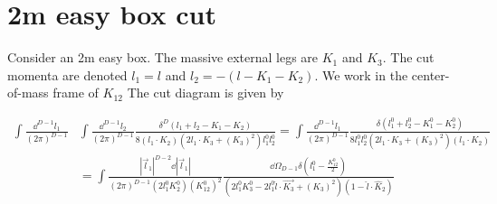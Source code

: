\section{2m easy box cut}
Consider an 2m easy box.
The massive external legs are $K_1$ and $K_3$.
The cut momenta are denoted $l_1 = l$ and $l_2 = -( l-K_1-K_2)$.
We work in the center-of-mass frame of $K_{12}$
The cut diagram is given by

\begin{equation*}
\begin{split}
\int\frac{\dd^{D-1}l_1}{(2\pi)^{D-1}} &
 \int\frac{\dd^{D-1}l_2}{(2\pi)^{D-1}}
\frac{\delta^{D}(l_1 + l_2 - K_1- K_2)}{8(l_1\cdot K_2)(2l_1\cdot K_3 + (K_3)^2)l_1^0 l_2^0} 
 = 
\int\frac{\dd^{D-1}l_1}{(2\pi)^{D-1}} 
\frac{\delta(l_1^0 + l_2^0 - K_1^0 - K_2^0)}{8 l_1^0 l_2^0 (2l_1\cdot K_3 + (K_3)^2)(l_1\cdot K_2)}
\\
& = \int\frac{|\vec{l}_1|^{D-2} \dd |\vec{l}_1|}{(2\pi)^{D-1}(2l_1^0 K_2^0)(K_{12}^0)^2}
\frac{\dd \Omega_{D-1} \delta(l_1^0 - \frac{K^0_{12}}{2})}{(2l_1^0 K_3^0 - 2l_1^0 \hat{l}\cdot\vec{K_3} + (K_3)^2)(1-\hat{l}\cdot \hat{K}_2)}
\end{split}
\end{equation*}

